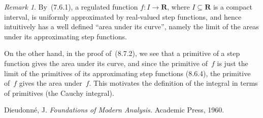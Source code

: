 \documentclass[letterpaper,12pt]{article}
\newcommand{\R}{\mathbf{R}}
\theoremstyle{plain}
\theoremstyle{definition}
\theoremstyle{remark}
\newtheorem*{rmk}{Remark}
\begin{document}
\begin{rmk}
By~(7.6.1), a regulated function \(f:I\to\R\), where \(I\subseteq\R\) is a compact interval, is uniformly approximated by real-valued step functions, and hence intuitively has a well defined ``area under its curve'', namely the limit of the areas under its approximating step functions.

On the other hand, in the proof of~(8.7.2), we see that a primitive of a step function gives the area under its curve, and since the primitive of~\(f\) is just the limit of the primitives of its approximating step functions (8.6.4), the primitive of~\(f\) gives the area under~\(f\). This motivates the definition of the integral in terms of primitives (the Cauchy integral).
\end{rmk}

\begin{thebibliography}{0}
 Dieudonn\'e, J. \textit{Foundations of Modern Analysis.} Academic Press, 1960.
\end{thebibliography}
\end{document}
